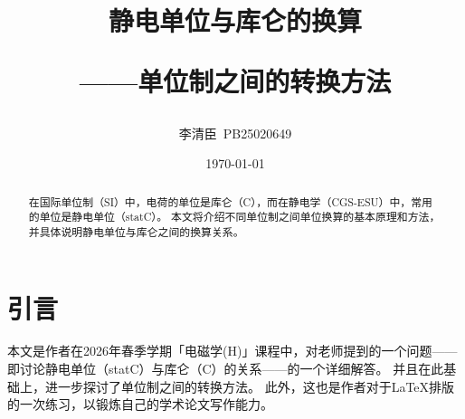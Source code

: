 \documentclass[12pt,a4paper,UTF8,fontset=fandol]{ctexart}
\title{静电单位与库仑的换算 \\[1ex] \large
\begin{flushright}
    ——单位制之间的转换方法
\end{flushright}}
\author{李清臣\ PB25020649}
\date{\today}
\begin{document}
\maketitle

\begin{abstract}
    在国际单位制（SI）中，电荷的单位是库仑（C），而在静电学（CGS-ESU）中，常用的单位是静电单位（statC）。
    本文将介绍不同单位制之间单位换算的基本原理和方法，并具体说明静电单位与库仑之间的换算关系。
\end{abstract}

\section{引言}
本文是作者在2026年春季学期「电磁学(H)」课程中，对老师提到的一个问题——即讨论静电单位（statC）与库仑（C）的关系——的一个详细解答。
并且在此基础上，进一步探讨了单位制之间的转换方法。
此外，这也是作者对于\LaTeX 排版的一次练习，以锻炼自己的学术论文写作能力。
\end{document}
